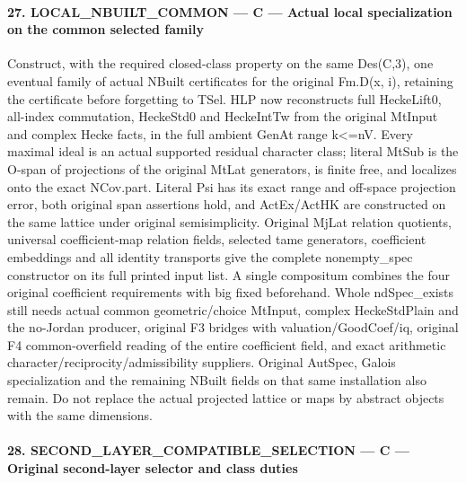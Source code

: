 \documentclass[11pt,a4paper]{article}
\numberwithin{equation}{section}
\theoremstyle{remark}\newtheorem{remark}[theorem]{Remark}
\begin{document}
\paragraph{27. LOCAL\_\allowbreak{}NBUILT\_\allowbreak{}COMMON — C — Actual local specialization on the common selected family}

Construct, with the required closed-class property on the same Des(C,3), one eventual family of actual NBuilt certificates for the original Fm.D(x,\allowbreak{} i), retaining the certificate before forgetting to TSel. HLP now reconstructs full HeckeLift0, all-index commutation, HeckeStd0 and HeckeIntTw from the original MtInput and complex Hecke facts, in the full ambient GenAt range k<=nV. Every maximal ideal is an actual supported residual character class; literal MtSub is the O-span of projections of the original MtLat generators, is finite free, and localizes onto the exact NCov.part. Literal Psi has its exact range and off-space projection error, both original span assertions hold, and ActEx/\allowbreak{}ActHK are constructed on the same lattice under original semisimplicity. Original MjLat relation quotients, universal coefficient-map relation fields, selected tame generators, coefficient embeddings and all identity transports give the complete nonempty\_\allowbreak{}spec constructor on its full printed input list. A single compositum combines the four original coefficient requirements with big fixed beforehand. Whole ndSpec\_\allowbreak{}exists still needs actual common geometric/\allowbreak{}choice MtInput, complex HeckeStdPlain and the no-Jordan producer, original F3 bridges with valuation/\allowbreak{}GoodCoef/\allowbreak{}iq, original F4 common-overfield reading of the entire coefficient field, and exact arithmetic character/\allowbreak{}reciprocity/\allowbreak{}admissibility suppliers. Original AutSpec, Galois specialization and the remaining NBuilt fields on that same installation also remain. Do not replace the actual projected lattice or maps by abstract objects with the same dimensions.


\paragraph{28. SECOND\_\allowbreak{}LAYER\_\allowbreak{}COMPATIBLE\_\allowbreak{}SELECTION — C — Original second-layer selector and class duties}
\end{document}
